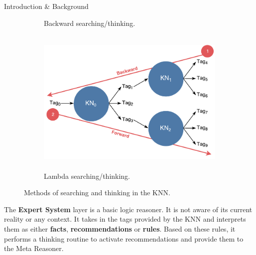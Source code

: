 \documentclass[final]{beamer} %
\begin{document}
\begin{frame}
\begin{columns}
\begin{column}{.33\textwidth}
{\begin{block}{Introduction \& Background}
\begin{figure}[!htb]
\begin{subfigure}[!htb]{0.49\columnwidth}
							\caption{Backward searching/thinking.}
							\label{think_backwards}
						\end{subfigure}
						\begin{subfigure}[!htb]{0.49\columnwidth}
							\centering
							\includegraphics[height=2.8in]{figures/lambda_search.pdf}
							\caption{Lambda searching/thinking.}
							\label{think_lambda}
						\end{subfigure}
						\caption{Methods of searching and thinking in the KNN.}
					\end{figure}
					
					\parbox{0.99\textwidth}{The \textbf{Expert System} layer is a basic logic reasoner. It is not aware of its current reality or any context. It takes in the tags provided by the KNN and interprets them as either \textbf{facts}, \textbf{recommendations} or \textbf{rules}. Based on these rules, it performs a thinking routine to activate recommendations and provide them to the Meta Reasoner.
						
}
\end{block}}
\end{column}
\end{columns}
\end{frame}
\end{document}
